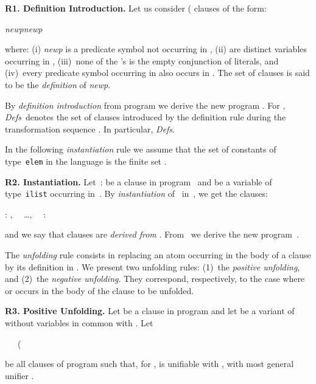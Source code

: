 \documentclass[english]{tlp}
\newcommand{\Mathit}[1]{\mbox{\it #1}}
\newcommand{\Defsn}{\Mathit{Defs}}
\newcommand{\Defsz}{\Mathit{Defs}\/}
\begin{document}
\medskip

\noindent \textbf{R1. Definition Introduction.} Let us consider  ( clauses of the form:
\smallskip{}

 {\it{newp}}{\it{newp}}

\smallskip{}

\noindent where: (i) {\it{newp}} is a predicate symbol not occurring
in , (ii)  are
distinct variables occurring in ,
(iii)~none of the 's is the empty conjunction of literals,
and (iv)~every predicate symbol occurring in  also occurs in . The set  of clauses is said to be the {\em definition} of
{\it{newp}}.

\noindent By \emph{definition introduction} from program  we derive the new program . For ,
\Defsn~denotes the set of clauses introduced by the definition rule
during the transformation sequence . In
particular, \Defsz.

\medskip{}

\noindent In the following {\em instantiation} rule we assume that the set
 of constants of type~\texttt{elem} in the language
 is the finite set
.

\smallskip

\noindent \textbf{R2. Instantiation.}\label{rule:inst} Let~:
 be a clause in program~ and  be a variable
of type~\texttt{ilist} occurring in~. By
\emph{instantiation} of~ in~, we get the clauses:

\smallskip

: ,
~~\ldots,~~ : 

\smallskip

\noindent and we say that clauses  are
{\it{derived from}} . From~ we derive the new
program~.

\medskip

The \emph{unfolding} rule consists in replacing an atom 
occurring in the body of a clause by its definition in . We
present two unfolding rules: (1)~the {\em positive unfolding}, and
(2)~the {\em negative unfolding}. They correspond, respectively, to
the case where  or  occurs in the body of the clause to
be unfolded.

\medskip

\noindent \textbf{R3. Positive Unfolding.} Let  be a clause in program  and let  be a variant of  without
variables in common with . Let

\smallskip

 \ \ \ (

\smallskip{}

\noindent be all clauses of program  such that, for ,  is unifiable with , with most
general unifier .
\end{document}
